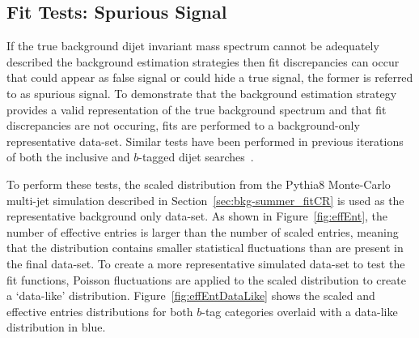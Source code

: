 \FloatBarrier
\subsection{Fit Tests: Spurious Signal}
\label{sec:bkg-summer_spusig}

If the true background dijet invariant mass spectrum cannot be adequately described the background estimation strategies
then fit discrepancies can occur that could appear as false signal or could hide a true signal, the former is referred to as spurious signal.
To demonstrate that the background estimation strategy provides a valid representation of the true background spectrum
and that fit discrepancies are not occuring, fits are performed to a background-only representative data-set.
Similar tests have been performed in previous iterations of both the inclusive and $b$-tagged dijet searches~\cite{dijet-mori16_paper,dibjet-mori16_paper}.

To perform these tests, the scaled distribution from the {\sc Pythia}8 Monte-Carlo multi-jet simulation
described in Section~\ref{sec:bkg-summer_fitCR}
is used as the representative background only data-set.
As shown in Figure~\ref{fig:effEnt},
the number of effective entries is larger than the number of scaled entries,
meaning that the distribution contains smaller statistical fluctuations than are present in the final data-set.
To create a more representative simulated data-set to test the fit functions,
Poisson fluctuations are applied to the scaled distribution to create a `data-like' distribution.
Figure~\ref{fig:effEntDataLike} shows the scaled and effective entries distributions for both
$b$-tag categories overlaid with a data-like distribution in blue.

